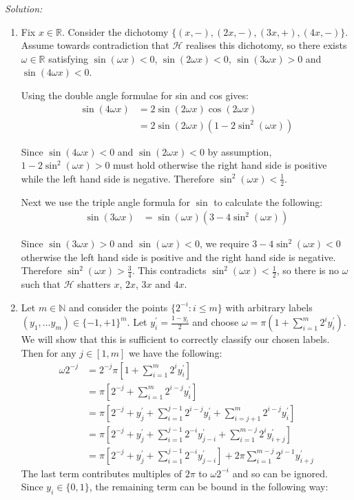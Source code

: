 \documentclass[
10pt, %
a4paper, %
oneside, %
headinclude,footinclude, %
BCOR5mm, %
]{scrartcl}
\newenvironment{solution}
               {\textit{Solution:}}
               {}
\begin{document}
\begin{solution}
\begin{enumerate}[label= (\alph*)]
  \item Fix $x\in\mathbb{R}$. Consider the dichotomy $\{(x, -), (2x, -), (3x, +), (4x, -)\}$. Assume towards contradiction that $\mathcal{H}$ realises this dichotomy, so there exists $\omega\in\mathbb{R}$ satisfying $\sin(\omega x) < 0$, $\sin(2 \omega x) < 0$, $\sin(3 \omega x) > 0$ and $\sin(4 \omega x) < 0$.

  Using the double angle formulae for sin and cos gives:
  \begin{align*}
    \sin(4\omega x) &= 2 \sin(2\omega x)\cos(2\omega x) \\
    &= 2\sin(2\omega x) (1 - 2\sin^2(\omega x))
  \end{align*}

  Since $\sin(4\omega x) < 0$ and $\sin(2\omega x) < 0$ by assumption, $1 - 2\sin^2(\omega x) > 0$ must hold otherwise the right hand side is positive while the left hand side is negative. Therefore $\sin^2(\omega x) < \frac{1}{2}$.

  Next we use the triple angle formula for $\sin$ to calculate the following:
  \begin{align*}
    \sin(3\omega x) &= \sin(\omega x)(3 - 4\sin^2(\omega x))
  \end{align*}

  Since $\sin(3\omega x) > 0$ and $\sin(\omega x) < 0$, we require $3 - 4\sin^2(\omega x) < 0$ otherwise the left hand side is positive and the right hand side is negative. Therefore $\sin^2(\omega x) > \frac{3}{4}$. This contradicts $\sin^2(\omega x) < \frac{1}{2}$, so there is no $\omega$ such that $\mathcal{H}$ shatters $x$, $2x$, $3x$ and $4x$.

\item Let $m \in \mathbb{N}$ and consider the points $\{2^{-i}: i \leq m\}$ with arbitrary labels $(y_1, \ldots y_{m}) \in {\{-1, +1\}}^m$. Let $y_i^\prime = \frac{1-y_i}{2}$ and choose $\omega = \pi(1 + \sum_{i=1}^m 2^{i}y_i^\prime)$. We will show that this is sufficient to correctly classify our chosen labels. Then for any $j\in[1,m]$ we have the following:
    \begin{align*}
      \omega 2^{-j} &= 2^{-j} \pi\left[1 + \sum_{i=1}^m 2^{i}y_i^\prime\right] \\
      &= \pi \left[2^{-j} + \sum_{i=1}^m 2^{i-j}y_i^\prime\right] \\
      &= \pi \left[2^{-j} + y_j^\prime + \sum_{i=1}^{j-1} 2^{i-j}y_i^\prime + \sum_{i=j+1}^m 2^{i-j}y_i^\prime \right] \\
      &= \pi \left[2^{-j} + y_j^\prime + \sum_{i=1}^{j-1} 2^{-i}y_{j-i}^\prime + \sum_{i=1}^{m-j} 2^i y_{i+j}^\prime \right] \\
      &= \pi \left[2^{-j} + y_j^\prime + \sum_{i=1}^{j-1} 2^{-i}y_{j-i}^\prime\right] + 2\pi \sum_{i=1}^{m-j} 2^{i-1}y_{i+j}^\prime
    \end{align*}
  The last term contributes multiples of $2\pi$ to $\omega 2^{-i}$ and so can be ignored. Since $y_i\in\{0,1\}$, the remaining term can be bound in the following way:


\end{enumerate}
\end{solution}
\end{document}
